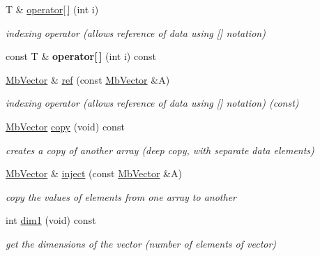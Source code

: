 \begin{DoxyCompactItemize}
\mbox{\label{class_mb_vector_a013ee5f6f44187dbd1ecbbbd9e8f7785}} 
T \& \mbox{\hyperlink{class_mb_vector_a013ee5f6f44187dbd1ecbbbd9e8f7785}{operator\mbox{[}$\,$\mbox{]}}} (int i)
\begin{DoxyCompactList}\small\item\em indexing operator (allows reference of data using \mbox{[}\mbox{]} notation) \end{DoxyCompactList}\item 
\mbox{\label{class_mb_vector_abb85893f61c5ff21fb2864a48e2a830a}} 
const T \& {\bfseries operator\mbox{[}$\,$\mbox{]}} (int i) const
\item 
\mbox{\hyperlink{class_mb_vector}{Mb\+Vector}} \& \mbox{\hyperlink{class_mb_vector_af32339427953f6173daeb55a47098907}{ref}} (const \mbox{\hyperlink{class_mb_vector}{Mb\+Vector}} \&A)
\begin{DoxyCompactList}\small\item\em indexing operator (allows reference of data using \mbox{[}\mbox{]} notation) (const) \end{DoxyCompactList}\item 
\mbox{\hyperlink{class_mb_vector}{Mb\+Vector}} \mbox{\hyperlink{class_mb_vector_afa32c2ecf3505826f287b20a3ef60cc1}{copy}} (void) const
\begin{DoxyCompactList}\small\item\em creates a copy of another array (deep copy, with separate data elements) \end{DoxyCompactList}\item 
\mbox{\label{class_mb_vector_a8bda3ea5c35ae194e403888883ad025d}} 
\mbox{\hyperlink{class_mb_vector}{Mb\+Vector}} \& \mbox{\hyperlink{class_mb_vector_a8bda3ea5c35ae194e403888883ad025d}{inject}} (const \mbox{\hyperlink{class_mb_vector}{Mb\+Vector}} \&A)
\begin{DoxyCompactList}\small\item\em copy the values of elements from one array to another \end{DoxyCompactList}\item 
\mbox{\label{class_mb_vector_a8fa74ce55ec03ba4720d4e403dfc6f07}} 
int \mbox{\hyperlink{class_mb_vector_a8fa74ce55ec03ba4720d4e403dfc6f07}{dim1}} (void) const
\begin{DoxyCompactList}\small\item\em get the dimensions of the vector (number of elements of vector) \end{DoxyCompactList}\item 

\end{DoxyCompactItemize}
